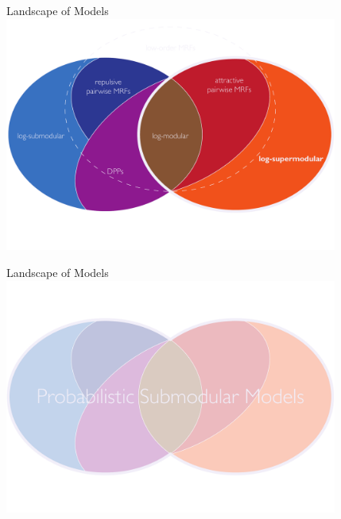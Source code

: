 \documentclass[mathserif]{beamer}
\begin{document}
\begin{frame}{Landscape of Models}
\centering
\includegraphics[width=4.3in]{figures/venn07.pdf}
\end{frame}

\begin{frame}{Landscape of Models}
\centering
\includegraphics[width=4.3in]{figures/venn08.pdf}
\end{frame}
\end{document}
